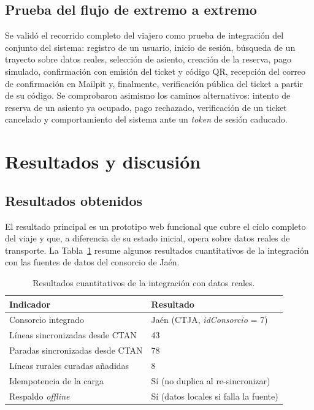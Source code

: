 \subsection{Prueba del flujo de extremo a extremo}

Se validó el recorrido completo del viajero como prueba de integración del conjunto del sistema: registro de un usuario, inicio de sesión, búsqueda de un trayecto sobre datos reales, selección de asiento, creación de la reserva, pago simulado, confirmación con emisión del ticket y código QR, recepción del correo de confirmación en Mailpit y, finalmente, verificación pública del ticket a partir de su código. Se comprobaron asimismo los caminos alternativos: intento de reserva de un asiento ya ocupado, pago rechazado, verificación de un ticket cancelado y comportamiento del sistema ante un \textit{token} de sesión caducado.


\section{Resultados y discusión}
\label{sec:resultados-discusion}

\subsection{Resultados obtenidos}

El resultado principal es un prototipo web funcional que cubre el ciclo completo del viaje y que, a diferencia de su estado inicial, opera sobre datos reales de transporte. La Tabla~\ref{tab:resultados-cuant} resume algunos resultados cuantitativos de la integración con las fuentes de datos del consorcio de Jaén.

\begin{table}[h!]
\centering
\small
\begin{tabular}{|p{8cm}|p{5.5cm}|}
\hline
\textbf{Indicador} & \textbf{Resultado} \\ \hline
Consorcio integrado & Jaén (CTJA, \textit{idConsorcio} = 7) \\ \hline
Líneas sincronizadas desde CTAN & 43 \\ \hline
Paradas sincronizadas desde CTAN & 78 \\ \hline
Líneas rurales curadas añadidas & 8 \\ \hline
Idempotencia de la carga & Sí (no duplica al re-sincronizar) \\ \hline
Respaldo \textit{offline} & Sí (datos locales si falla la fuente) \\ \hline
\end{tabular}
\caption{Resultados cuantitativos de la integración con datos reales.}
\label{tab:resultados-cuant}
\end{table}

